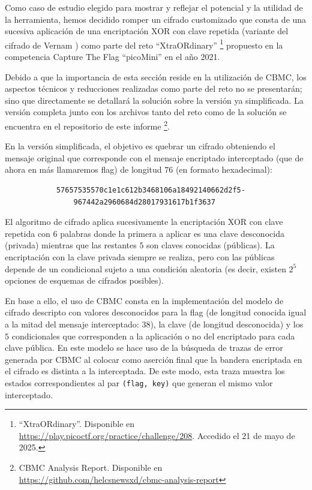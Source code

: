 \documentclass[runningheads]{llncs}
\begin{document}
Como caso de estudio elegido para mostrar y reflejar el potencial y la utilidad de la herramienta, hemos decidido romper un cifrado customizado que consta 
de una sucesiva aplicación de una encriptación XOR con clave repetida (variante del cifrado de Vernam \cite{crypto-book}) como parte 
del reto ``XtraORdinary'' \footnote{``XtraORdinary''. Disponible en \url{https://play.picoctf.org/practice/challenge/208}. Accedido el 21 de mayo de 2025.}
propuesto en la competencia Capture The Flag ``picoMini'' en el año 2021.

Debido a que la importancia de esta sección reside en la utilización de CBMC, los aspectos técnicos y reducciones realizadas como parte del reto no se presentarán; 
sino que directamente se detallará la solución sobre la versión ya simplificada.
La versión completa junto con los archivos tanto del reto como de la solución se encuentra en el repositorio de este informe
\footnote{CBMC Analysis Report. Disponible en \url{https://github.com/helcsnewsxd/cbmc-analysis-report}}.

En la versión simplificada, el objetivo es quebrar un cifrado obteniendo el mensaje original que corresponde con el mensaje encriptado interceptado (que de ahora en más llamaremos flag)
de longitud $76$ (en formato hexadecimal):
\begin{verbatim}
            57657535570c1e1c612b3468106a18492140662d2f5-
                967442a2960684d28017931617b1f3637
\end{verbatim}

El algoritmo de cifrado aplica sucesivamente la encriptación XOR con clave repetida con $6$ palabras donde la primera a aplicar es una clave desconocida (privada)
mientras que las restantes $5$ son claves conocidas (públicas).
La encriptación con la clave privada siempre se realiza, pero con las públicas depende de un condicional sujeto a una condición aleatoria (es decir,
existen $2^5$ opciones de esquemas de cifrados posibles).

En base a ello, el uso de CBMC consta en la implementación del modelo de cifrado descripto con valores desconocidos para la flag (de longitud conocida igual 
a la mitad del mensaje interceptado: $38$), la clave (de longitud desconocida) y los $5$ condicionales que corresponden a la aplicación o no del encriptado para cada clave pública.
En este modelo se hace uso de la búsqueda de trazas de error generada por CBMC al colocar como aserción final que la bandera encriptada en el cifrado es distinta a la interceptada.
De este modo, esta traza muestra los estados correspondientes al par \texttt{(flag, key)} que generan el mismo valor interceptado.
\end{document}
